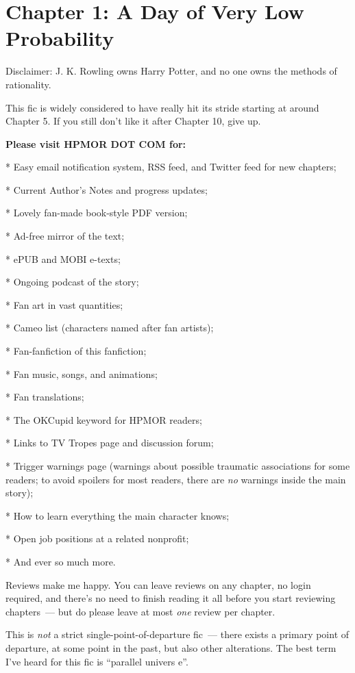 \chapter{Chapter 1: A Day of Very Low Probability}
Disclaimer: J. K. Rowling owns Harry Potter, and no one owns the methods of rationality.

This fic is widely considered to have really hit its stride starting at around Chapter 5. If you still don't like it after Chapter 10, give up.

\textbf{Please visit HPMOR DOT COM for:}

* Easy email notification system, RSS feed, and Twitter feed for new chapters;

* Current Author's Notes and progress updates;

* Lovely fan-made book-style PDF version;

* Ad-free mirror of the text;

* ePUB and MOBI e-texts;

* Ongoing podcast of the story;

* Fan art in vast quantities;

* Cameo list (characters named after fan artists);

* Fan-fanfiction of this fanfiction;

* Fan music, songs, and animations;

* Fan translations;

* The OKCupid keyword for HPMOR readers;

* Links to TV Tropes page and discussion forum;

* Trigger warnings page (warnings about possible traumatic associations for some readers; to avoid spoilers for most readers, there are \emph{no} warnings inside the main story);

* How to learn everything the main character knows;

* Open job positions at a related nonprofit;

* And ever so much more.

Reviews make me happy. You can leave reviews on any chapter, no login required, and there's no need to finish reading it all before you start reviewing chapters~--- but do please leave at most \emph{one} review per chapter.

This is \emph{not} a strict single-point-of-departure fic~--- there exists a primary point of departure, at some point in the past, but also other alterations. The best term I've heard for this fic is ``parallel univers e''.

